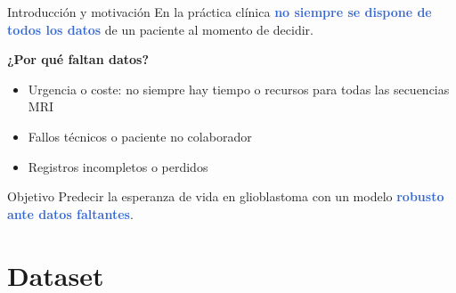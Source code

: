 \documentclass[aspectratio=169]{beamer}
\newcommand{\hl}[1]{\textcolor{highlight}{\textbf{#1}}}
\begin{document}
\begin{frame}{Introducción y motivación}
    En la práctica clínica \hl{no siempre se dispone de todos los datos} de un paciente al momento de decidir.

    \medskip
    \textbf{¿Por qué faltan datos?}
    \begin{itemize}
      \item Urgencia o coste: no siempre hay tiempo o recursos para todas las secuencias MRI
      \item Fallos técnicos o paciente no colaborador
      \item Registros incompletos o perdidos
    \end{itemize}

    \medskip
    \begin{block}{Objetivo}
      Predecir la esperanza de vida en glioblastoma con un modelo \hl{robusto ante datos faltantes}.
    \end{block}
\end{frame}

\section{Dataset}
\end{document}
